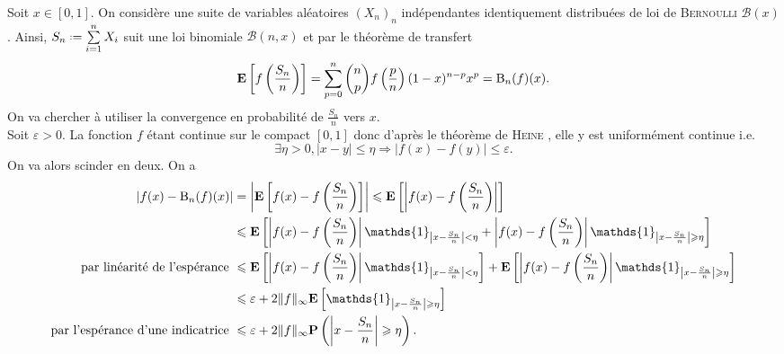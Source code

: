 \begin{preuve}
    Soit $x \in [0, 1]$. On considère une suite de variables aléatoires $(X_n)_n$ indépendantes identiquement distribuées de loi de \textsc{Bernoulli} $\mathscr{B}(x)$. Ainsi, $S_n \defeq \sum\limits_{i=1}^n X_i$ suit une loi binomiale $\mathscr{B}(n, x)$ \note et par le théorème de transfert
    $$\mathbf{E} \left[ f\left( \frac{S_n}{n} \right) \right] = \sum_{p=0}^n \binom{n}{p} f \left( \frac{p}{n} \right) (1-x)^{n-p} x^p = \mathrm{B}_n(f)(x).$$
    On va chercher à utiliser la convergence en probabilité de $\frac{S_n}{n}$ vers $x$. \\
    Soit $\varepsilon > 0$. La fonction $f$ étant continue sur le compact $[0, 1]$ donc d'après le théorème de \textsc{Heine} \note, elle y est uniformément continue i.e.
    $$\exists \eta > 0, |x-y| \leqslant \eta \Rightarrow |f(x) - f(y)| \leqslant \varepsilon.$$
    On va alors scinder en deux. On a
    \begin{align*}
        |f(x) - \Bernstein_n(f)(x)| &= \left| \E \left[ f(x) - f\left( \frac{S_n}{n} \right) \right] \right| \leqslant \E \left[ \left| f(x) - f \left( \frac{S_n}{n} \right) \right| \right] \\
        &\leqslant \E \left[ \left| f(x) - f \left( \frac{S_n}{n} \right) \right| \mathds{1}_{\left| x - \frac{S_n}{n} \right| < \eta} + \left| f(x) - f \left( \frac{S_n}{n} \right) \right| \mathds{1}_{\left| x - \frac{S_n}{n} \right| \geqslant \eta} \right] \\
        \text{par linéarité de l'espérance } &\leqslant \E \left[ \left| f(x) - f \left( \frac{S_n}{n} \right) \right| \mathds{1}_{\left| x - \frac{S_n}{n} \right| < \eta} \right] + \E \left[ \left| f(x) - f \left( \frac{S_n}{n} \right) \right| \mathds{1}_{\left| x - \frac{S_n}{n} \right| \geqslant \eta} \right] \\
        &\leqslant \varepsilon + 2 \Ninf{f} \E \left[ \mathds{1}_{\left| x - \frac{S_n}{n} \right| \geqslant \eta} \right] \\
        \text{par l'espérance d'une indicatrice } &\leqslant \varepsilon + 2 \Ninf{f} \P \left( \left| x - \frac{S_n}{n} \right| \geqslant \eta \right).

\end{align*}
\end{preuve}
